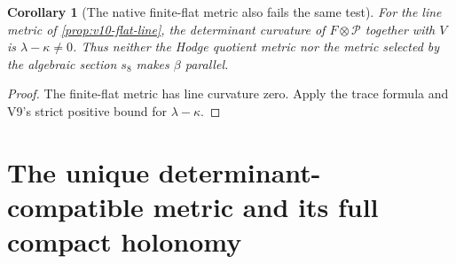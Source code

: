 \documentclass[11pt]{article}
\newtheorem{corollary}[corollary]{Corollary}
\theoremstyle{definition}
\theoremstyle{remark}
\begin{document}
\begin{corollary}[The native finite-flat metric also fails the same test]
\label{cor:v10-flat-fails}
For the line metric of \cref{prop:v10-flat-line}, the determinant
curvature of $F\otimes\mathscr P$ together with $V$ is
$\lambda-\kappa\ne0$. Thus neither the Hodge quotient metric nor the
metric selected by the algebraic section $s_8$ makes $\beta$ parallel.
\end{corollary}
\begin{proof}
The finite-flat metric has line curvature zero. Apply the trace formula
and V9's strict positive bound for $\lambda-\kappa$.
\end{proof}

\section{The unique determinant-compatible metric and its full compact holonomy}
\label{sec:v10-balanced}
\end{document}
